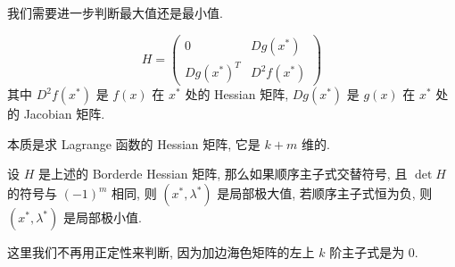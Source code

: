 \begin{note}
    我们需要进一步判断最大值还是最小值.
\end{note}
\begin{definition}
    \begin{equation}
        H = \begin{pmatrix}
            0 & Dg(x^*) \\
            Dg(x^*)^T & D^2 f(x^*)
        \end{pmatrix}
    \end{equation}
    其中 $D^2 f(x^*)$ 是 $f(x)$ 在 $x^*$ 处的 Hessian 矩阵, $Dg(x^*)$ 是 $g(x)$ 在 $x^*$ 处的 Jacobian 矩阵.

    本质是求 Lagrange 函数的 Hessian 矩阵, 它是 $k+m$ 维的.
\end{definition}
\begin{theorem}
    设 $H$ 是上述的 Borderde Hessian 矩阵, 那么如果顺序主子式交替符号, 且 $\det H$ 的符号与 $(-1)^m$ 相同, 则 $(x^*, \lambda^*)$ 是局部极大值, 若顺序主子式恒为负, 则 $(x^*, \lambda^*)$ 是局部极小值.
\end{theorem}
\begin{note}
这里我们不再用正定性来判断, 因为加边海色矩阵的左上 $k$ 阶主子式是为 $0$.
\end{note}

%







